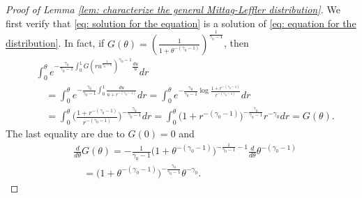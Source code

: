 \documentclass[12pt, a4paper]{amsart}
\theoremstyle{definition}
\numberwithin{equation}{section}
\begin{document}
\begin{proof}[Proof of Lemma \ref{lem: characterize the general Mittag-Leffler distribution}]
	
	We first verify that \eqref{eq: solution for the equation}  is a solution of \eqref{eq: equation for the distribution}.
	In fact, if $G(\theta) = (\frac{1}{1+ \theta^{-(\gamma_0 - 1)}})^{\frac{1}{\gamma_0 - 1}}$, then
\[\begin{split}
	& \int_0^\theta e^{- \frac{\gamma_0} {\gamma_0 - 1} \int_0^1 G(ru^{\frac{1}{\gamma_0 - 1}})^{\gamma_0 - 1}\frac{du}{u}} dr
	\\&\quad = \int_0^\theta e^{- \frac{\gamma_0} {\gamma_0 - 1} \int_0^1 \frac{du}{u+r^{-(\gamma_0 - 1)}} } dr
	= \int_0^\theta e^{- \frac{\gamma_0} {\gamma_0 - 1} \log\frac{1+r^{-(\gamma_0 - 1)}}{r^{-(\gamma_0 - 1)} } } dr
	\\&\quad = \int_0^\theta \big(\frac{1+r^{-(\gamma_0 - 1)}}{r^{-(\gamma_0 - 1)} }\big)^{- \frac{\gamma_0} {\gamma_0 - 1}} dr
	= \int_0^\theta \big( 1 + r^{ - ( \gamma_0 - 1 ) } \big)^{- \frac{\gamma_0} {\gamma_0 - 1}} r^{-\gamma_0} dr
	= G(\theta).
\end{split}\]
	The last equality are due to $G(0) = 0$ and
\[\begin{split}
	&\frac{d}{d\theta}G(\theta)
	= - \frac{1}{\gamma_0 - 1} \big(1+\theta^{-(\gamma_0 - 1)}\big)^{- \frac{1}{\gamma_0 - 1} - 1} \frac{d}{d\theta} \theta^{-(\gamma_0 - 1)}
	\\&\quad =  \big(1+\theta^{-(\gamma_0 - 1)}\big)^{- \frac{\gamma_0}{\gamma_0 - 1} } \theta^{-\gamma_0}.
\end{split}\]
	

\end{proof}
\end{document}
